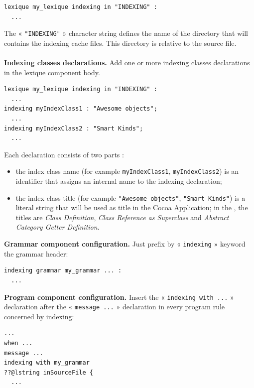 \begin{lstlisting}[language=galgas]
lexique my_lexique indexing in "INDEXING" :
  ...
\end{lstlisting}

The « \texttt{"INDEXING"} » character string defines the name of the directory that will contains the indexing cache files. This directory is relative to the source file.
 \\
 \\
 \textbf{Indexing classes declarations.} Add one or more indexing classes declarations in the lexique component body.


\begin{lstlisting}[language=galgas]
lexique my_lexique indexing in "INDEXING" :
  ...
indexing myIndexClass1 : "Awesome objects";
  ...
indexing myIndexClass2 : "Smart Kinds";
  ...
\end{lstlisting}

Each declaration consists of two parts :
\begin{itemize}
\item the index class name (for example \texttt{myIndexClass1}, \texttt{myIndexClass2}) is an identifier that assigns an internal name to the indexing declaration;
\item the index class title (for example \texttt{"Awesome objects"}, \texttt{"Smart Kinds"}) is a literal string that will be used as title in the Cocoa Application; in the , the titles are \emph{Class Definition}, \emph{Class Reference as Superclass} and \emph{Abstract Category Getter Definition}.
\end{itemize}

\noindent{} \textbf{Grammar component configuration.} Just prefix by « \texttt{indexing} » keyword the grammar header:

\begin{lstlisting}[language=galgas]
indexing grammar my_grammar ... :
  ...
\end{lstlisting}



\noindent{} \textbf{Program component configuration.} Insert the « \texttt{indexing with ...} » declaration after the « \texttt{message ...} » declaration in every program rule concerned by indexing:

\begin{lstlisting}[language=galgas]
  ...
when ...
message ...
indexing with my_grammar
??@lstring inSourceFile {
  ...
\end{lstlisting}






